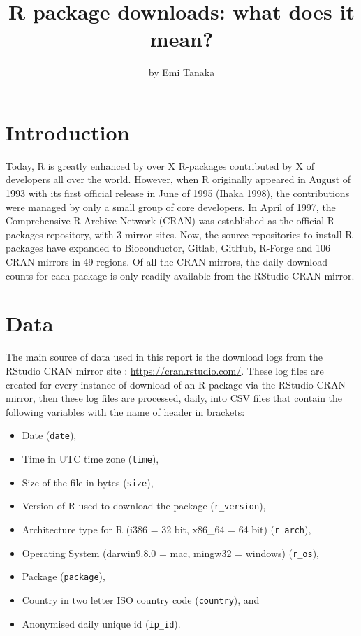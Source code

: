 \title{R package downloads: what does it mean?}
\author{by Emi Tanaka}

\maketitle


\hypertarget{introduction}{%
\section{Introduction}\label{introduction}}

Today, R is greatly enhanced by over X R-packages contributed by X of
developers all over the world. However, when R originally appeared in
August of 1993 with its first official release in June of 1995 (Ihaka
1998), the contributions were managed by only a small group of core
developers. In April of 1997, the Comprehensive R Archive Network (CRAN)
was established as the official R-packages repository, with 3 mirror
sites. Now, the source repositories to install R-packages have expanded
to Bioconductor, Gitlab, GitHub, R-Forge and 106 CRAN mirrors in 49
regions. Of all the CRAN mirrors, the daily download counts for each
package is only readily available from the RStudio CRAN mirror.

\hypertarget{data}{%
\section{Data}\label{data}}

The main source of data used in this report is the download logs from
the RStudio CRAN mirror site : \url{https://cran.rstudio.com/}. These
log files are created for every instance of download of an R-package via
the RStudio CRAN mirror, then these log files are processed, daily, into
CSV files that contain the following variables with the name of header
in brackets:

\begin{itemize}
\tightlist
\item
  Date (\texttt{date}),
\item
  Time in UTC time zone (\texttt{time}),
\item
  Size of the file in bytes (\texttt{size}),
\item
  Version of R used to download the package (\texttt{r\_version}),
\item
  Architecture type for R (i386 = 32 bit, x86\_64 = 64 bit)
  (\texttt{r\_arch}),
\item
  Operating System (darwin9.8.0 = mac, mingw32 = windows)
  (\texttt{r\_os}),
\item
  Package (\texttt{package}),
\item
  Country in two letter ISO country code (\texttt{country}), and
\item
  Anonymised daily unique id (\texttt{ip\_id}).
\end{itemize}

